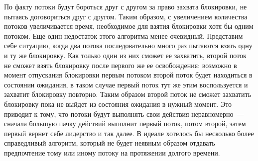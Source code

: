 По факту потоки будут бороться друг с другом за право захвата блокировки, не пытаясь договориться друг с другом. Таким образом, с увеличением количества потоков увеличивается время, необходимое для взятия блокировки хотя бы одним потоком. Еще один недостаток этого алгоритма менее очевидный. Представим себе ситуацию, когда два потока последовательно много раз пытаются взять одну и ту же блокировку. Как только один из них сможет ее захватить, второй поток не сможет взять блокировку после первого же ее освобождения: возможно в момент отпускания блокировки первым потоком второй поток будет находиться в состоянии ожидания, в таком случае первый поток тут же этим воспользуется и захватит блокировку повторно. Таким образом второй поток не сможет захватить блокировку пока не выйдет из состояния ожидания в нужный момент. Это приводит к тому, что потоки будут выполнять свои действия неравномерно~--- сначала большую пачку действий выполнит первый поток, потом второй, затем первый вернет себе лидерство и так далее. В идеале хотелось бы несколько более справедливый алгоритм, который не будет неявным образом отдавать предпочтение тому или иному потоку на протяжении долгого времени.